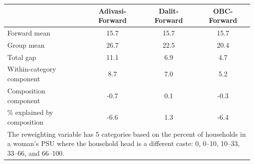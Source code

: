 \begin{tabular}{l*{3}{c}}
\hline\hline
            &\multicolumn{1}{c}{Adivasi-Forward}&\multicolumn{1}{c}{Dalit-Forward}&\multicolumn{1}{c}{OBC-Forward}\\
\hline
\hline
Forward mean&        15.7&        15.7&        15.7\\
Group mean  &        26.7&        22.5&        20.4\\
Total gap   &        11.1&         6.9&         4.7\\
Within-category component&         8.7&         7.0&         5.2\\
Composition component&        -0.7&         0.1&        -0.3\\
\% explained by composition&        -6.6&         1.3&        -6.4\\
\hline\hline
\multicolumn{4}{l}{\footnotesize \parbox[t]{0.95\linewidth}{The reweighting variable has 5 categories based on the percent of households in a woman's PSU where the household head is a different caste: 0, 0--10, 10--33, 33--66, and 66--100.}}\\
\end{tabular}
